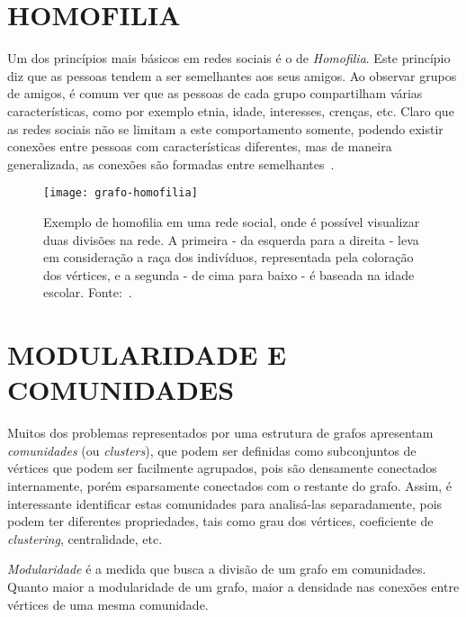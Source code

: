 \section{\texorpdfstring{\MakeUppercase{Homofilia}}{}}
\label{conceitos__homofilia}

Um dos princípios mais básicos em redes sociais é o de \emph{Homofilia}. Este princípio diz que as pessoas tendem a ser semelhantes aos seus amigos. Ao observar grupos de amigos, é comum ver que as pessoas de cada grupo compartilham várias características, como por exemplo etnia, idade, interesses, crenças, etc. Claro que as redes sociais não se limitam a este comportamento somente, podendo existir conexões entre pessoas com características diferentes, mas de maneira generalizada, as conexões são formadas entre semelhantes~\cite{easley2010networks}.

\begin{figure}[H]
\texttt{[image: grafo-homofilia]}
\centering
\caption{
     Exemplo de homofilia em uma rede social, onde é possível visualizar duas divisões na rede. A primeira - da esquerda para a direita - leva em consideração a raça dos indivíduos, representada pela coloração dos vértices, e a segunda - de cima para baixo - é baseada na idade escolar. Fonte:~\cite{moody2001race}.
}
\label{fig:grafo-homofilia}
\end{figure}

\section{\texorpdfstring{\MakeUppercase{Modularidade e Comunidades}}{}}
\label{conceitos__modularidade}

Muitos dos problemas representados por uma estrutura de grafos apresentam \emph{comunidades} (ou \emph{clusters}), que podem ser definidas como subconjuntos de vértices que podem ser facilmente agrupados, pois são densamente conectados internamente, porém esparsamente conectados com o restante do grafo. Assim, é interessante identificar estas comunidades para analisá-las separadamente, pois podem ter diferentes propriedades, tais como grau dos vértices, coeficiente de \emph{clustering}, centralidade, etc.

\emph{Modularidade} é a medida que busca a divisão de um grafo em comunidades. Quanto maior a modularidade de um grafo, maior a densidade nas conexões entre vértices de uma mesma comunidade.

